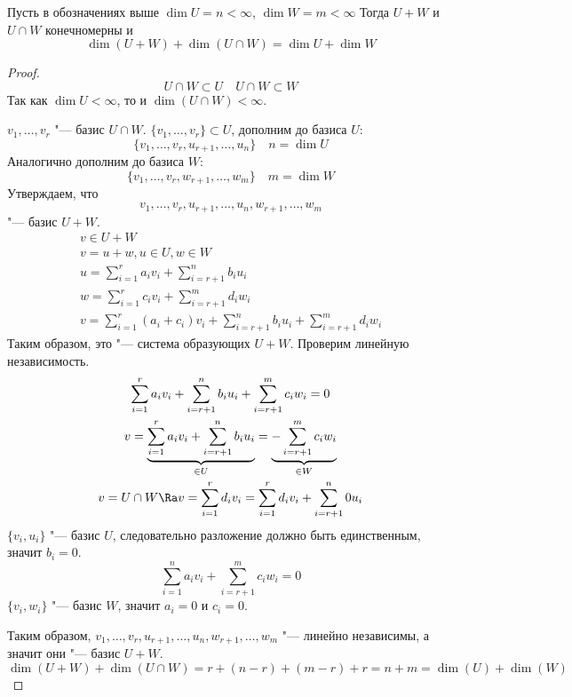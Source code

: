\begin{theorem}
	Пусть в обозначениях выше $\dim U = n < \infty$, $\dim W = m < \infty$
	Тогда $U + W$ и $U \cap W$ конечномерны и
	\[ \dim(U + W) + \dim(U \cap W) = \dim U + \dim W \]
\end{theorem}
\begin{proof}
	\[ U \cap W \subset U \quad U \cap W \subset W \]
	Так как $\dim U < \infty$, то и $\dim (U \cap W) < \infty$.

	$v_1, \dots, v_r$ "--- базис  $U \cap W$.
	$\{v_1, \dots, v_r\} \subset U$, дополним до базиса $U$:
	\[ \{v_1, \dots, v_r, u_{r + 1}, \dots, u_{n}\} \quad n = \dim U \]
	Аналогично дополним до базиса $W$:
	\[ \{v_1, \dots, v_r, w_{r + 1}, \dots, w_{m}\} \quad m = \dim W \]
	Утверждаем, что
	\[ v_1, \dots, v_r, u_{r + 1}, \dots, u_n, w_{r + 1}, \dots, w_{m} \]
	"--- базис $U + W$.
	\begin{gather*}
		v \in U + W \\
		v = u + w, u \in U, w \in W \\
		u = \sum_{i = 1}^{r}a_iv_i + \sum_{i = r + 1}^{n}b_iu_i \\
		w = \sum_{i = 1}^{r}c_iv_i + \sum_{i = r + 1}^{m}d_iw_i \\
		v = \sum_{i = 1}^{r}(a_i + c_i)v_i + \sum_{i = r + 1}^{n}b_iu_i + \sum_{i = r + 1}^{m}d_iw_i
	\end{gather*}
	Таким образом, это "--- система образующих $U + W$.
	Проверим линейную независимость.
	\begin{gather*}
		\sum_{i = 1}^{r}a_iv_i + \sum_{i = r + 1}^{n}b_iu_i + \sum_{i = r + 1}^{m}c_iw_i = 0 \\
		v = \underbrace{\sum_{i = 1}^{r}a_iv_i + \sum_{i = r + 1}^{n}b_iu_i}_{\in U} = \underbrace{-\sum_{i = r + 1}^{m}c_iw_i}_{\in W} \\
		v = U \cap W \Ra v = \sum_{i = 1}^{r}d_iv_i = \sum_{i = 1}^{r}d_iv_i + \sum_{i = r + 1}^{n}0u_i
	\end{gather*}
	$\{v_i, u_i\}$ "--- базис $U$, следовательно разложение должно быть единственным, значит $b_i = 0$.
	\[ \sum_{i = 1}^{n}a_iv_i + \sum_{i = r + 1}^{m}c_iw_i = 0 \]
	$\{v_i, w_i\}$ "--- базис $W$, значит $a_i = 0$ и $c_i = 0$.

	Таким образом, $v_1, \dots, v_r, u_{r + 1}, \dots, u_n, w_{r + 1}, \dots, w_{m}$ "--- линейно независимы,
	а значит они "--- базис $U + W$.
	\[ \dim(U + W) + \dim(U \cap W) = r + (n - r) + (m  - r) + r = n + m = \dim(U) + \dim(W) \]
\end{proof}
